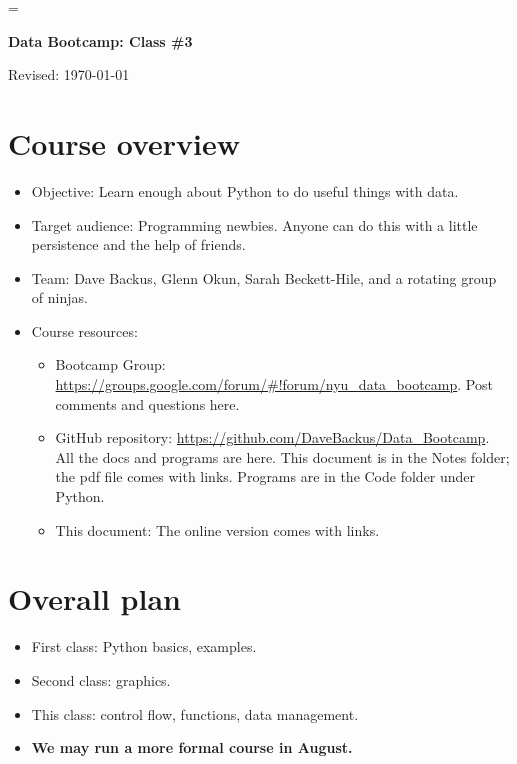 \documentclass[11pt]{article}
\begin{document}
\parskip=\bigskipamount
\parindent=0.0in
\thispagestyle{empty}


\bigskip\bigskip
\centerline{\Large \bf Data Bootcamp:  Class \#3}
\centerline{Revised: \today}

\begin{comment}
* Today:  control, data frames
* Before we start
    - start Spyder
    - download bootcamp_control.py
\end{comment}


\section{Course overview}

\begin{itemize}
\item Objective:  Learn enough about Python to do useful things with data.
\item Target audience:  Programming newbies.
Anyone can do this with a little persistence and the help of friends.


\item Team:  Dave Backus, Glenn Okun, Sarah Beckett-Hile, and a rotating group of ninjas.

\item Course resources:
\begin{itemize}
\item Bootcamp Group:  \url{https://groups.google.com/forum/#!forum/nyu_data_bootcamp}.
Post comments and questions here.

\item GitHub repository:  \url{https://github.com/DaveBackus/Data_Bootcamp}.
All the docs and programs are here.
This document is in the Notes folder;
the pdf file comes with links.
Programs are in the Code folder under Python.
\item This document:  The online version comes with links.
\end{itemize}

\end{itemize}


\section{Overall plan}

\begin{itemize}
\item First class:  Python basics, examples.
\item Second class:  graphics.
\item This class:  control flow, functions, data management.
\item {\bf We may run a more formal course in August.}
\end{itemize}
\end{document}
